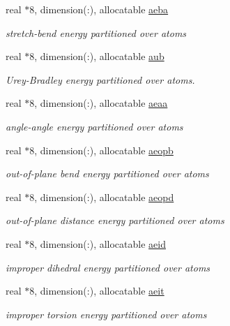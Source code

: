 \begin{DoxyCompactItemize}
real $\ast$8, dimension(\-:), allocatable \hyperlink{classanalyz_ae422b72bdca95decd1938af39d9d63f4}{aeba}
\begin{DoxyCompactList}\small\item\em stretch-\/bend energy partitioned over atoms \end{DoxyCompactList}\item 
real $\ast$8, dimension(\-:), allocatable \hyperlink{classanalyz_a813f954b0c85a8b9cbba01b4ddc4922d}{aub}
\begin{DoxyCompactList}\small\item\em Urey-\/\-Bradley energy partitioned over atoms. \end{DoxyCompactList}\item 
real $\ast$8, dimension(\-:), allocatable \hyperlink{classanalyz_a5765b45f639e73a203564e3a4f354071}{aeaa}
\begin{DoxyCompactList}\small\item\em angle-\/angle energy partitioned over atoms \end{DoxyCompactList}\item 
real $\ast$8, dimension(\-:), allocatable \hyperlink{classanalyz_a8433635543cd9863396246887a452619}{aeopb}
\begin{DoxyCompactList}\small\item\em out-\/of-\/plane bend energy partitioned over atoms \end{DoxyCompactList}\item 
real $\ast$8, dimension(\-:), allocatable \hyperlink{classanalyz_ad0b333412711890551fc2dc1fa0c4dbb}{aeopd}
\begin{DoxyCompactList}\small\item\em out-\/of-\/plane distance energy partitioned over atoms \end{DoxyCompactList}\item 
real $\ast$8, dimension(\-:), allocatable \hyperlink{classanalyz_af8f4812410c86c689b41c11d48c9f2d5}{aeid}
\begin{DoxyCompactList}\small\item\em improper dihedral energy partitioned over atoms \end{DoxyCompactList}\item 
real $\ast$8, dimension(\-:), allocatable \hyperlink{classanalyz_ae0dc531ebf4d305c50c00ce58da3e06f}{aeit}
\begin{DoxyCompactList}\small\item\em improper torsion energy partitioned over atoms \end{DoxyCompactList}\item 

\end{DoxyCompactItemize}

